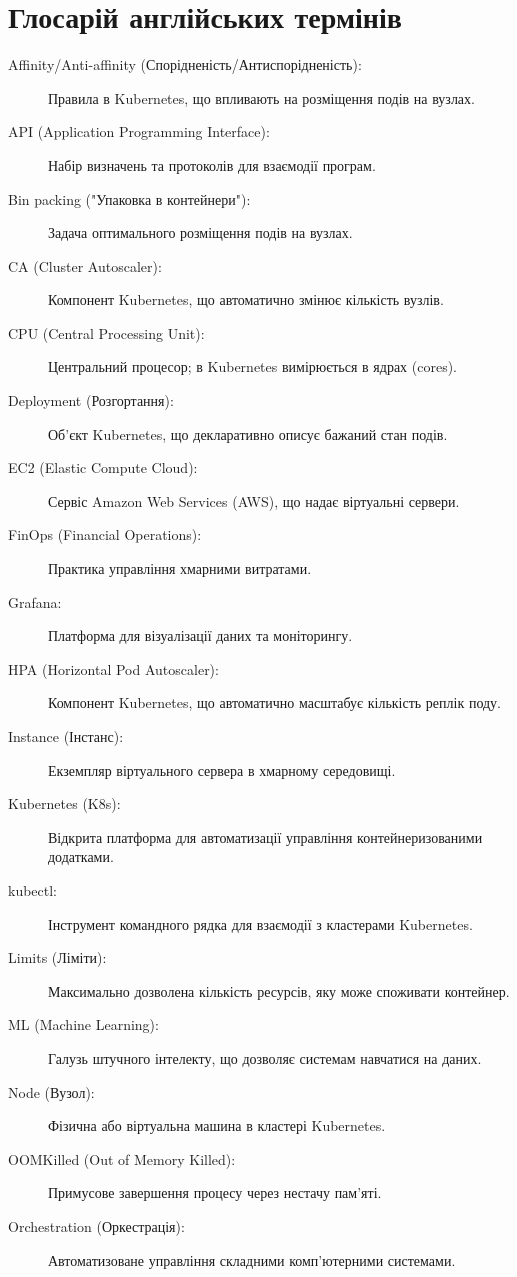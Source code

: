 \chapter{Глосарій англійських термінів}
\begin{description}
	\item[Affinity/Anti-affinity (Спорідненість/Антиспорідненість):]  Правила в Kubernetes, що впливають на розміщення подів на вузлах. 
	\item[API (Application Programming Interface):] Набір визначень та протоколів для взаємодії програм. 
	\item[Bin packing ("Упаковка в контейнери"):] Задача оптимального розміщення подів на вузлах. 
	\item[CA (Cluster Autoscaler):] Компонент Kubernetes, що автоматично змінює кількість вузлів. 
	\item[CPU (Central Processing Unit):] Центральний процесор; в Kubernetes вимірюється в ядрах (cores). 
	\item[Deployment (Розгортання):] Об'єкт Kubernetes, що декларативно описує бажаний стан подів. 
	\item[EC2 (Elastic Compute Cloud):] Сервіс Amazon Web Services (AWS), що надає віртуальні сервери. 
	\item[FinOps (Financial Operations):] Практика управління хмарними витратами. 
	\item[Grafana:] Платформа для візуалізації даних та моніторингу. 
	\item[HPA (Horizontal Pod Autoscaler):] Компонент Kubernetes, що автоматично масштабує кількість реплік поду. 
	\item[Instance (Інстанс):] Екземпляр віртуального сервера в хмарному середовищі. 
	\item[Kubernetes (K8s):] Відкрита платформа для автоматизації управління контейнеризованими додатками. 
	\item[kubectl:] Інструмент командного рядка для взаємодії з кластерами Kubernetes. 
	\item[Limits (Ліміти):] Максимально дозволена кількість ресурсів, яку може споживати контейнер. 
	\item[ML (Machine Learning):] Галузь штучного інтелекту, що дозволяє системам навчатися на даних. 
	\item[Node (Вузол):] Фізична або віртуальна машина в кластері Kubernetes. 
	\item[OOMKilled (Out of Memory Killed):] Примусове завершення процесу через нестачу пам'яті. 
	\item[Orchestration (Оркестрація):] Автоматизоване управління складними комп'ютерними системами. 

\end{description}
